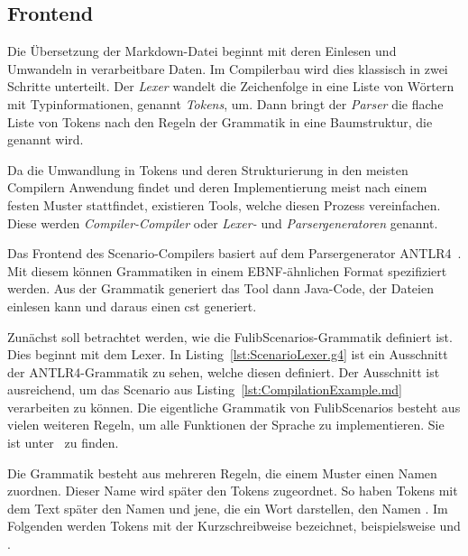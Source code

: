 \subsection{Frontend}\label{subsec:frontend-antlr4}

Die Übersetzung der Markdown-Datei beginnt mit deren Einlesen und Umwandeln in verarbeitbare Daten.
Im Compilerbau wird dies klassisch in zwei Schritte unterteilt.
Der \emph{Lexer} wandelt die Zeichenfolge in eine Liste von Wörtern mit Typinformationen, genannt \emph{Tokens}, um.
Dann bringt der \emph{Parser} die flache Liste von Tokens nach den Regeln der Grammatik in eine Baumstruktur, die  genannt wird.

Da die Umwandlung in Tokens und deren Strukturierung in den meisten Compilern Anwendung findet und deren Implementierung meist nach einem festen Muster stattfindet, existieren Tools, welche diesen Prozess vereinfachen.
Diese werden \emph{Compiler-Compiler} oder \emph{Lexer-} und \emph{Parsergeneratoren} genannt.

Das Frontend des Scenario-Compilers basiert auf dem Parsergenerator ANTLR4~\cite{antlr4-reference}.
Mit diesem können Grammatiken in einem EBNF-ähnlichen Format spezifiziert werden.
Aus der Grammatik generiert das Tool dann Java-Code, der Dateien einlesen kann und daraus einen \ac{cst} generiert.

Zunächst soll betrachtet werden, wie die FulibScenarios-Grammatik definiert ist.
Dies beginnt mit dem Lexer.
In Listing~\ref{lst:ScenarioLexer.g4} ist ein Ausschnitt der ANTLR4-Grammatik zu sehen, welche diesen definiert.
Der Ausschnitt ist ausreichend, um das Scenario aus Listing~\ref{lst:CompilationExample.md} verarbeiten zu können.
Die eigentliche Grammatik von FulibScenarios besteht aus vielen weiteren Regeln, um alle Funktionen der Sprache zu implementieren.
Sie ist unter~\cite{lexer-grammar} zu finden.


Die Grammatik besteht aus mehreren Regeln, die einem Muster einen Namen zuordnen.
Dieser Name wird später den Tokens zugeordnet.
So haben Tokens mit dem Text  später den Namen  und jene, die ein Wort darstellen, den Namen .
Im Folgenden werden Tokens mit der Kurzschreibweise  bezeichnet, beispielsweise  und .

